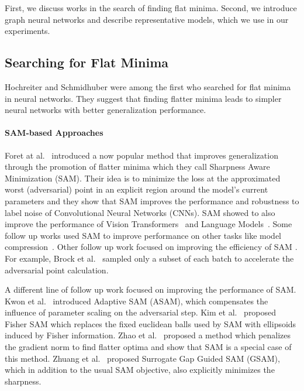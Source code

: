 \documentclass[runningheads]{llncs}
\begin{document}
First, we discuss works in the search of finding flat minima.
Second, we introduce graph neural networks and describe representative models, which we use in our experiments.

\subsection{Searching for Flat Minima}

Hochreiter and Schmidhuber \cite{HochreiterS94,flatminima} were among the first who searched for flat minima in neural networks.
They suggest that finding flatter minima leads to simpler neural networks with better generalization performance.

\paragraph*{SAM-based Approaches}
Foret at al.~\cite{Foret21sharpness} introduced a now popular method that improves generalization through the promotion of flatter minima which they call Sharpness Aware Minimization (SAM).
Their idea is to minimize the loss at the approximated worst (adversarial) point in an explicit region around the model's current parameters and they show that SAM improves the performance and robustness to label noise of Convolutional Neural Networks (CNNs).
SAM showed to also improve the performance of Vision Transformers~\cite{DBLP:conf/iclr/ChenHG22} and Language Models~\cite{Bahri21sharpness}.
Some follow up works used SAM to improve performance on other tasks like model compression~\cite{DBLP:journals/corr/abs-2111-12273,DBLP:journals/corr/abs-2205-12694}.
Other follow up work focused on improving the efficiency of SAM \cite{lookSam}.
For example, Brock et al.~\cite{Brock21high} sampled only a subset of each batch to accelerate the adversarial point calculation.

A different line of follow up work focused on improving the performance of SAM. \label{rw:sharpred}
Kwon et al.~\cite{Kwon21asam} introduced Adaptive SAM (ASAM), which compensates the influence of parameter scaling on the adversarial step.
Kim et al.~\cite{DBLP:conf/icml/Kim0HH22} proposed Fisher SAM which replaces the fixed euclidean balls used by SAM with ellipsoids induced by Fisher information.
Zhao et al.~\cite{zhao2022penalizing} proposed a method which penalizes the gradient norm to find flatter optima and show that SAM is a special case of this method.
Zhuang et al.~\cite{GSAM} proposed Surrogate Gap Guided SAM (GSAM), which in addition to the usual SAM objective, also explicitly minimizes the sharpness.
\end{document}
